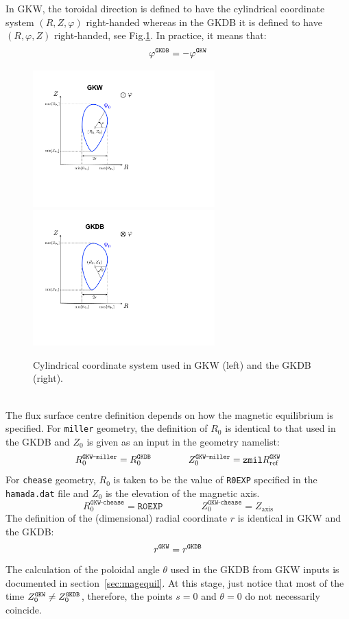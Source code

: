 \documentclass[a4paper]{report}
\begin{document}
In GKW, the toroidal direction is defined to have the cylindrical coordinate system $(R,Z,\varphi)$ right-handed whereas in the GKDB it is defined to have $(R,\varphi,Z)$ right-handed, see Fig.\ref{fig:coord1}. In practice, it means that: 
\begin{equation}
\varphi^{\texttt{GKDB}}=-\varphi^{\texttt{GKW}}
\end{equation}
\begin{figure}[h]
	\begin{center}
		\includegraphics[width=7cm]{GKW_coord.pdf}
		\includegraphics[width=7cm]{GKDB_coord.pdf}
		\caption{\label{fig:coord1} Cylindrical coordinate system used in GKW (left) and the GKDB (right).}
	\end{center}
\end{figure}\\
The flux surface centre definition depends on how the magnetic equilibrium is specified. For \texttt{miller} geometry, the definition of $R_0$ is identical to that used in the GKDB and $Z_0$ is given as an input in the geometry namelist:
\begin{equation}
R_0^\texttt{GKW-miller} = R_0^{\texttt{GKDB}} \qquad \qquad Z_0^\texttt{GKW-miller} = \texttt{zmil}R_{\textrm{ref}}^{\texttt{GKW}}
\end{equation}
For \texttt{chease} geometry, $R_0$ is taken to be the value of \texttt{R0EXP} specified in the \texttt{hamada.dat} file and $Z_0$ is the elevation of the magnetic axis.
\begin{equation}
R_0^\texttt{GKW-chease} = \texttt{R0EXP} \qquad \qquad Z_0^\texttt{GKW-chease} = Z_\textrm{axis}
\end{equation}
The definition of the (dimensional) radial coordinate $r$ is identical in GKW and the GKDB:
\begin{equation}
r^{\texttt{GKW}} = r^{\texttt{GKDB}}
\end{equation}
The calculation of the  poloidal angle $\theta$ used in the GKDB from GKW inputs is documented in section~\ref{sec:magequil}. At this stage, just notice that most of the time $Z_0^{\texttt{GKW}}\neq Z_0^{\texttt{GKDB}}$, therefore, the points $s=0$ and $\theta=0$ do not necessarily coincide. 
\end{document}
